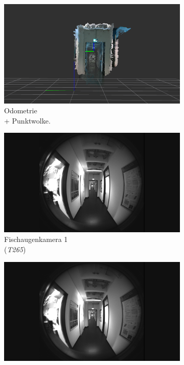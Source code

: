 \begin{figure}[h!]
	\centering
	\begin{subfigure}[b]{0.31\linewidth}
		\includegraphics[width=\linewidth]{images/dataset/pointcloud3.png}
		\caption{Odometrie \\ + Punktwolke.}
	\end{subfigure}
	\hfill
	\begin{subfigure}[b]{0.31\linewidth}
		\includegraphics[width=\linewidth]{images/dataset/f1_frame000005.png}
		\caption{Fischaugenkamera 1 \\(\textit{T265})}
	\end{subfigure}
	\hfill
	\begin{subfigure}[b]{0.31\linewidth}
		\includegraphics[width=\linewidth]{images/dataset/f2_frame000005.png}

\end{subfigure}
\end{figure}
